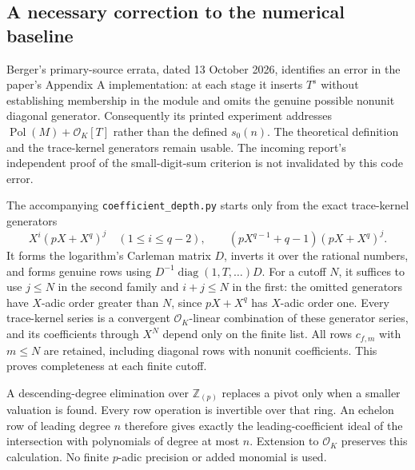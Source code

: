 \subsection{A necessary correction to the numerical baseline}
Berger's primary-source errata, dated 13 October 2026, identifies an error in
the paper's Appendix A implementation: at each stage it inserts $T^s$
without establishing membership in the module and omits the genuine
possible nonunit diagonal generator.  Consequently its printed experiment
addresses $\operatorname{Pol}(M)+\mathcal O_K[T]$ rather than the defined
$s_0(n)$.  The theoretical definition and the trace-kernel generators remain
usable.  The incoming report's independent proof of the small-digit-sum
criterion is not invalidated by this code error.

The accompanying \texttt{coefficient\_depth.py} starts only from the exact
trace-kernel generators
\[
 X^i(pX+X^q)^j\quad(1\le i\le q-2),\qquad
 (pX^{q-1}+q-1)(pX+X^q)^j.
\]
It forms the logarithm's Carleman matrix $D$, inverts it over the rational
numbers, and forms genuine rows using $D^{-1}\operatorname{diag}(1,T,\dots)D$.
For a cutoff $N$, it suffices to use $j\le N$ in the second family and
$i+j\le N$ in the first: the omitted generators have $X$-adic order
greater than $N$, since $pX+X^q$ has $X$-adic order one.  Every trace-kernel
series is a convergent $\mathcal O_K$-linear combination of these generator
series, and its coefficients through $X^N$ depend only on the finite list.
All rows $c_{f,m}$ with $m\le N$ are retained, including diagonal rows with
nonunit coefficients.  This proves completeness at each finite cutoff.

A descending-degree elimination over $\mathbb Z_{(p)}$ replaces a pivot only
when a smaller valuation is found.  Every row operation is invertible over
that ring.  An echelon row of leading degree $n$ therefore gives exactly the
leading-coefficient ideal of the intersection with polynomials of degree
at most $n$.  Extension to $\mathcal O_K$ preserves this calculation.
No finite $p$-adic precision or added monomial is used.

